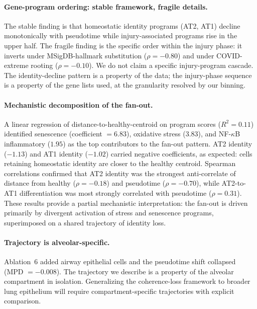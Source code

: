 \documentclass[11pt]{article}
\begin{document}
\paragraph{Gene-program ordering: stable framework, fragile details.} The stable finding is that homeostatic identity programs (AT2, AT1) decline monotonically with pseudotime while injury-associated programs rise in the upper half. The fragile finding is the specific order within the injury phase: it inverts under MSigDB-hallmark substitution ($\rho = -0.80$) and under COVID-extreme rooting ($\rho = -0.10$). We do not claim a specific injury-program cascade. The identity-decline pattern is a property of the data; the injury-phase sequence is a property of the gene lists used, at the granularity resolved by our binning.

\paragraph{Mechanistic decomposition of the fan-out.} A linear regression of distance-to-healthy-centroid on program scores ($R^2 = 0.11$) identified senescence (coefficient $= 6.83$), oxidative stress ($3.83$), and NF-$\kappa$B inflammatory ($1.95$) as the top contributors to the fan-out pattern. AT2 identity ($-1.13$) and AT1 identity ($-1.02$) carried negative coefficients, as expected: cells retaining homeostatic identity are closer to the healthy centroid. Spearman correlations confirmed that AT2 identity was the strongest anti-correlate of distance from healthy ($\rho = -0.18$) and pseudotime ($\rho = -0.70$), while AT2-to-AT1 differentiation was most strongly correlated with pseudotime ($\rho = 0.31$). These results provide a partial mechanistic interpretation: the fan-out is driven primarily by divergent activation of stress and senescence programs, superimposed on a shared trajectory of identity loss.

\paragraph{Trajectory is alveolar-specific.} Ablation~6 added airway epithelial cells and the pseudotime shift collapsed (MPD $= -0.008$). The trajectory we describe is a property of the alveolar compartment in isolation. Generalizing the coherence-loss framework to broader lung epithelium will require compartment-specific trajectories with explicit comparison.
\end{document}
